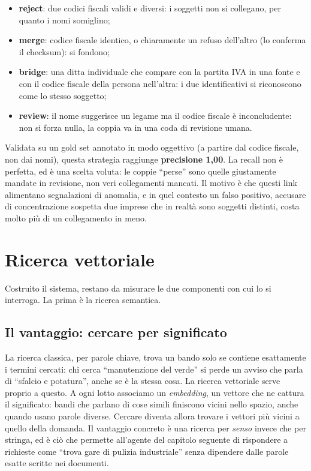 \documentclass[11pt,a4paper]{article}
\begin{document}
\begin{itemize}
  \item \textbf{reject}: due codici fiscali validi e diversi: i soggetti non si collegano,
        per quanto i nomi somiglino;
  \item \textbf{merge}: codice fiscale identico, o chiaramente un refuso dell'altro
        (lo conferma il checksum): si fondono;
  \item \textbf{bridge}: una ditta individuale che compare con la partita IVA in una fonte e
        con il codice fiscale della persona nell'altra: i due identificativi si riconoscono
        come lo stesso soggetto;
  \item \textbf{review}: il nome suggerisce un legame ma il codice fiscale è inconcludente:
        non si forza nulla, la coppia va in una coda di revisione umana.
\end{itemize}

\noindent
Validata su un gold set annotato in modo oggettivo (a partire dal codice fiscale, non dai nomi),
questa strategia raggiunge \textbf{precisione 1,00}. La recall non è perfetta, ed è una scelta
voluta: le coppie \enquote{perse} sono quelle giustamente mandate in revisione, non veri
collegamenti mancati. Il motivo è che questi link alimentano segnalazioni di anomalia, e in
quel contesto un falso positivo, accusare di concentrazione sospetta due imprese che in realtà
sono soggetti distinti, costa molto più di un collegamento in meno.

\section{Ricerca vettoriale}

Costruito il sistema, restano da misurare le due componenti con cui lo si interroga. La prima
è la ricerca semantica.

\subsection{Il vantaggio: cercare per significato}

La ricerca classica, per parole chiave, trova un bando solo se contiene esattamente i termini
cercati: chi cerca \enquote{manutenzione del verde} si perde un avviso che parla di
\enquote{sfalcio e potatura}, anche se è la stessa cosa. La ricerca vettoriale serve proprio a
questo. A ogni lotto associamo un \emph{embedding}, un vettore che ne cattura il significato:
bandi che parlano di cose simili finiscono vicini nello spazio, anche quando usano parole
diverse. Cercare diventa allora trovare i vettori più vicini a quello della domanda. Il
vantaggio concreto è una ricerca per \emph{senso} invece che per stringa, ed è ciò che permette
all'agente del capitolo seguente di rispondere a richieste come \enquote{trova gare di pulizia
industriale} senza dipendere dalle parole esatte scritte nei documenti.
\end{document}
